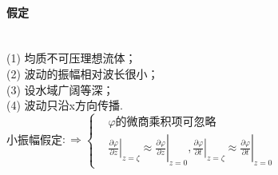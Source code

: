 \documentclass[a4paper,12pt]{article}
\begin{document}
    \paragraph{假定}~{}\\
    (1) 均质不可压理想流体；\\
    (2) 波动的振幅相对波长很小；\\
    (3) 设水域广阔等深；\\
    (4) 波动只沿x方向传播.\\
    小振幅假定$\displaystyle:\Rightarrow\left\{\begin{aligned}&\varphi\mbox{的微商乘积项可忽略}\\&\left.\left.\frac{\partial \varphi}{\partial z}\right|_{z=\zeta} \approx \frac{\partial \varphi}{\partial z}\right|_{z=0},\left.\left.\frac{\partial \varphi}{\partial t}\right|_{z=\zeta} \approx \frac{\partial \varphi}{\partial t}\right|_{z=0}\end{aligned}\right.$
\end{document}
